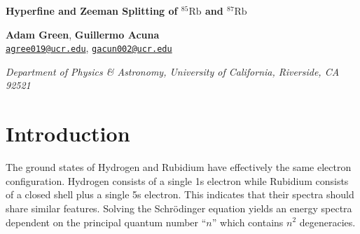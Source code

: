 \documentclass[12pt]{article}
\newcommand{\email}[1]{\href{mailto:#1}{\textcolor{mygreen1}{#1}}}
\newenvironment{institutions}[1][2em]{\begin{list}{}{\setlength\leftmargin{#1}\setlength\rightmargin{#1}}\item[]}{\end{list}}
\newcommand{\RbEF}{$^{85}\text{Rb}$ }
\newcommand{\RbES}{$^{87}\text{Rb}$ }
\begin{document}
	\begin{center}
		
		{\LARGE \bf Hyperfine and Zeeman Splitting of \RbEF and \RbES}\\

		\vspace{0.5cm}
		
		\textbf{Adam Green}, \textbf{Guillermo Acuna}\\
		
		\texttt{\footnotesize \email{agree019@ucr.edu}},
		\texttt{\footnotesize \email{gacun002@ucr.edu}}
		
		\vspace{0.5cm}
		
		
		\begin{institutions}[2.25cm]
			\footnotesize
			{\it 
				Department of Physics \& Astronomy, 
				University of  California, Riverside, 
				CA 92521	    
			}    
		\end{institutions}
		
		\vspace{0.5cm}
		
	\end{center}
	
	\vspace{0.5cm}
	\begin{abstract}
		In this experiment, we study the hyperfine splitting and Zeeman effect for naturally occurring Rubidium using saturated absorption spectroscopy. For $^{85}\text{Rb}$, we measure the splitting between the $F=2$ and $F=3$ states to be $3320 \ \text{MHz} \pm 117 \ \text{MHz}$. For $^{87}\text{Rb}$, we determine the splitting between the $F=1$ and $F=2$ state to be $7390 \ \text{MHz} \pm 117 \ \text{MHz}$. We provide quantitative energy level diagrams for both isotopes of Rubidium. Further, upon the application of an external magnetic field, we measure the splitting between the hyperfine transitions. We provide an analysis of Zeeman splitting vs magnetic field strength and we determine the Land\'e g-factor to be $g_F = 0.307 \pm 0.0103$.
	\end{abstract}
	
	\tableofcontents
	
	\section{Introduction}
	The ground states of Hydrogen and Rubidium have effectively the same electron configuration. Hydrogen consists of a single 1s electron while Rubidium consists of a closed shell plus a single 5s electron. This indicates that their spectra should share similar features. Solving the Schr\"odinger equation yields an energy spectra dependent on the principal quantum number ``$n$'' which contains $n^2$ degeneracies.
	
\end{document}
